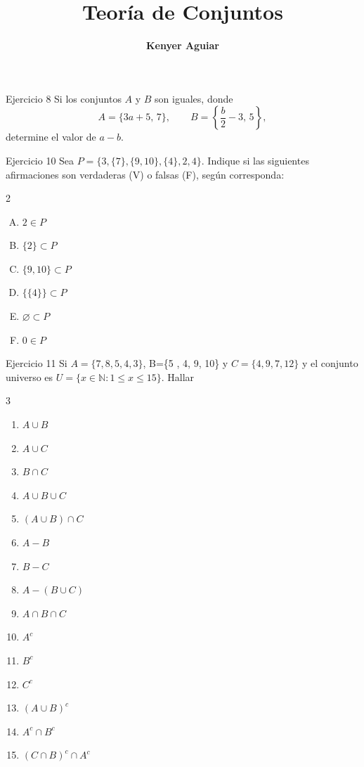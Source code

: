 \documentclass[aspectratio=169]{beamer}
\title{\Huge Teoría de Conjuntos}
\author{\textbf{\Large Kenyer Aguiar}}
\institute{\large\textbf{Objetivo de la clase:} \\[6pt]
Practicar ejercicios de Teoría de Conjuntos.}
\date{}
\begin{document}

\begin{frame}
	\titlepage
\end{frame}


\begin{frame}[t]{}
	\Large
	\begin{block}{Ejercicio 8}
		Si los conjuntos $A$ y $B$ son iguales, donde
		\[
			A=\{3a+5,\,7\}, \qquad B=\left\{\frac{b}{2}-3,\,5\right\},
		\]
		determine el valor de $a-b$.
	\end{block}
\end{frame}

\begin{frame}[t]{}
	\begin{block}{Ejercicio 10}
		\Large
		Sea $
			P=\{3,\{7\},\{9,10\},\{4\},2,4\}.$
		Indique si las siguientes afirmaciones son verdaderas (V) o falsas (F), según corresponda:
		\begin{multicols}{2}
			\begin{enumerate}[A)]
				\item $2 \in P$
				\item  $\{2\} \subset P$
				\item $\{9,10\} \subset P$
				\item $\{\{4\}\} \subset P$
				\item $\varnothing \subset P$
				\item $0\in P$
			\end{enumerate}
		\end{multicols}
	\end{block}
\end{frame}

\begin{frame}[t]{}
	\begin{block}{Ejercicio 11}
		Si $A=\{7, 8, 5 ,4 ,3\}$,  B=\{5 , 4, 9, 10\} y  $C=\{4, 9, 7, 12\}$ y el conjunto universo es $U=\{x\in\mathbb{N}: 1\leq x\leq 15\}.$
		Hallar
		\begin{multicols}{3}
			\begin{enumerate}
				\item $A\cup B$
				\item $A\cup C$
				\item $B\cap C$
				\item $A\cup B\cup C$
				\item $ (A \cup B)\cap C$
				\item $A-B$
				\item $B-C$
				\item $A-(B\cup C)$
				\item $A\cap B\cap C$
				\item $A^c$
				\item $B^c$
				\item $C^c$
				\item $(A\cup B)^c$
				\item $A^c \cap B^c$
				\item $(C\cap B)^c\cap A^c
				      $
			\end{enumerate}
		\end{multicols}
	\end{block}
\end{frame}
\end{document}
